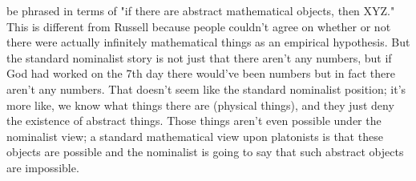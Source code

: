 \documentclass[12pt]{article}
\theoremstyle{definition}
\begin{document}
\begin{enumerate}
        be phrased in terms of "if there are abstract mathematical objects,
        then XYZ." This is different from Russell because people couldn't agree
        on whether or not there were actually infinitely mathematical things as
        an empirical hypothesis. But the standard nominalist story is not just
        that there aren't any numbers, but if God had worked on the 7th day
        there would've been numbers but in fact there aren't any numbers. That
        doesn't seem like the standard nominalist position; it's more like, we
        know what things there are (physical things), and they just deny the
        existence of abstract things. Those things aren't even possible under
        the nominalist view; a standard mathematical view upon platonists is
        that these objects are possible and the nominalist is going to say that
        such abstract objects are impossible.

\end{enumerate}
\end{document}
